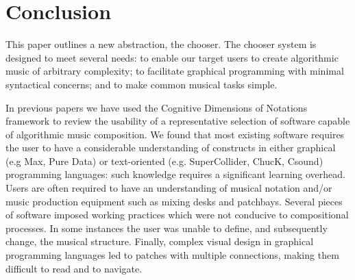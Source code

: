 \documentclass[runningheads,a4paper]{llncs}
\begin{document}








\section{Conclusion}\label{emergent-design-principles}

This paper outlines a new abstraction, the chooser. The chooser system is designed to meet several needs: to enable our target users to create algorithmic music of arbitrary complexity; to facilitate graphical programming with minimal syntactical concerns; and to make common musical tasks simple. 

In previous papers \cite{Bellingham1,Bellingham2} we have used the Cognitive Dimensions of Notations framework \cite{Green} to review the usability of a representative selection of software capable of algorithmic music composition. We found that most existing software requires the user to have a considerable understanding of constructs in either graphical (e.g Max, Pure Data) or text-oriented (e.g. SuperCollider, ChucK, Csound) programming languages: such knowledge requires a significant learning overhead. Users are often required to have an understanding of musical notation and/or music production equipment such as mixing desks and patchbays. Several pieces of software imposed working practices which were not conducive to compositional processes. In some instances the user was unable to define, and subsequently change, the musical structure. Finally, complex visual design in graphical programming languages led to patches with multiple connections, making them difficult to read and to navigate. 
\end{document}
